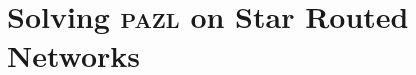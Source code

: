 \documentclass[10pt, conference, letterpaper]{IEEEtran}
\newtheorem{lemma}[theorem]{Lemma}
\newcommand\pazl{\textsc{pazl}\xspace}
\begin{document}
%
%
%    
%
%
%
%
%
%        
%
      
      
         \section{Solving \pazl on Star Routed Networks}\label{sec:PAZL}
         
\end{document}
